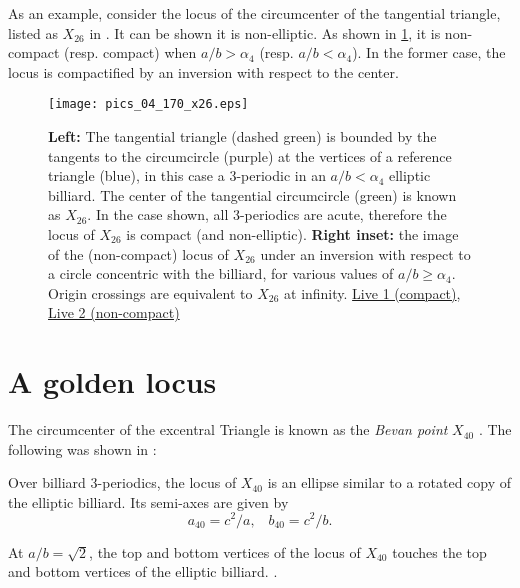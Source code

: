 As an example, consider the locus of the circumcenter of the tangential triangle, listed as $X_{26}$ in \cite{etc}. It can be shown it is non-elliptic. As shown in \cref{fig:04-locus-x26}, it is non-compact (resp. compact) when $a/b>\alpha_4$ (resp. $a/b<\alpha_4$). In the former case, the locus is compactified by an inversion with respect to the center.

\begin{figure}
    \centering
    \texttt{[image: pics\_04\_170\_x26.eps]}
    \caption{\textbf{Left:} The tangential triangle (dashed green) is bounded by the tangents to the circumcircle (purple)  at the vertices of a reference triangle (blue), in this case a 3-periodic in an $a/b<\alpha_4$ elliptic billiard. The center of the tangential circumcircle (green) is known as $X_{26}$. In the case shown, all 3-periodics are acute, therefore the locus of $X_{26}$ is compact (and non-elliptic). \textbf{Right inset:} the image of the (non-compact) locus of $X_{26}$ under an inversion with respect to a circle concentric with the billiard, for various values of $a/b{\geq}\alpha_4$. Origin crossings are equivalent to $X_{26}$ at infinity. \href{https://bit.ly/3446TYF}{Live 1 (compact)}, \href{https://bit.ly/3hMiTpT}{Live 2 (non-compact)}}
    \label{fig:04-locus-x26}
\end{figure}


\section{A golden locus}

The circumcenter of the excentral Triangle is known as the {\em Bevan point} $X_{40}$ \cite{etc}. The following was shown in \cite{garcia2020-ellipses}:

\begin{proposition}
Over billiard 3-periodics, the locus of $X_{40}$ is an ellipse similar to a rotated copy of the elliptic billiard. Its semi-axes are given by 
%
\begin{equation*}
    a_{40}=c^2/a,\;\;\; b_{40}=c^2/b.
\end{equation*}
\end{proposition}

\begin{corollary}
At $a/b=\sqrt{2}$, the top and bottom vertices of the locus of $X_{40}$ touches the top and bottom vertices of the elliptic billiard.
\label{cor:04-x40-tangent}.
\end{corollary}

